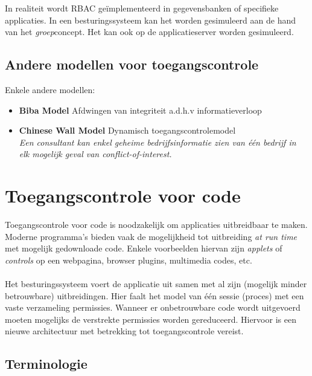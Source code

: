 \documentclass[../main.tex]{subfiles}
\begin{document}
In realiteit wordt RBAC ge\"implementeerd in gegevensbanken of specifieke applicaties. In een besturingssysteem kan het worden gesimuleerd aan de hand van het \textit{groep}concept. Het kan ook op de applicatieserver worden gesimuleerd.


\subsection{Andere modellen voor toegangscontrole}
Enkele andere modellen:
\begin{itemize}
	\item \textbf{Biba Model} Afdwingen van integriteit a.d.h.v informatieverloop
	\item \textbf{Chinese Wall Model} Dynamisch toegangscontrolemodel \\
	\textit{Een consultant kan enkel geheime bedrijfsinformatie zien van \'e\'en bedrijf in elk mogelijk geval van conflict-of-interest. }
\end{itemize}

\section{Toegangscontrole voor code}
Toegangscontrole voor code is noodzakelijk om applicaties uitbreidbaar te maken. Moderne programma's bieden vaak de mogelijkheid tot uitbreiding \textit{at run time} met mogelijk gedownloade code.  Enkele voorbeelden hiervan zijn \textit{applets} of \textit{controls} op een webpagina, browser plugins, multimedia codes, etc.
\\\\
Het besturingssysteem voert de applicatie uit samen met al zijn (mogelijk minder betrouwbare) uitbreidingen. Hier faalt het model van \'e\'en sessie (proces) met een vaste verzameling permissies. Wanneer er onbetrouwbare code wordt uitgevoerd moeten mogelijks de verstrekte permissies worden gereduceerd. Hiervoor is een nieuwe architectuur met betrekking tot toegangscontrole vereist.

\subsection{Terminologie}

\end{document}
